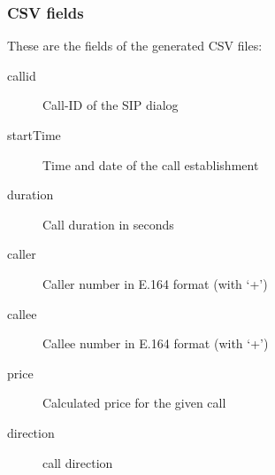 \documentclass[letterpaper,10pt,english]{sphinxmanual}
\begin{document}
\subsubsection{CSV fields}
\label{administration_portal/brand/calls/call_csv_schedulers:csv-fields}
These are the fields of the generated CSV files:
\begin{description}
\item[{callid}] \leavevmode{}\label{administration_portal/brand/calls/call_csv_schedulers:term-callid}
Call-ID of the SIP dialog

\item[{startTime}] \leavevmode{}\label{administration_portal/brand/calls/call_csv_schedulers:term-starttime}
Time and date of the call establishment

\item[{duration}] \leavevmode{}\label{administration_portal/brand/calls/call_csv_schedulers:term-duration}
Call duration in seconds

\item[{caller}] \leavevmode{}\label{administration_portal/brand/calls/call_csv_schedulers:term-caller}
Caller number in E.164 format (with `+')

\item[{callee}] \leavevmode{}\label{administration_portal/brand/calls/call_csv_schedulers:term-callee}
Callee number in E.164 format (with `+')

\item[{price}] \leavevmode{}\label{administration_portal/brand/calls/call_csv_schedulers:term-price}
Calculated price for the given call

\item[{direction}] \leavevmode{}\label{administration_portal/brand/calls/call_csv_schedulers:term-direction}
call direction

\end{description}
\end{document}
